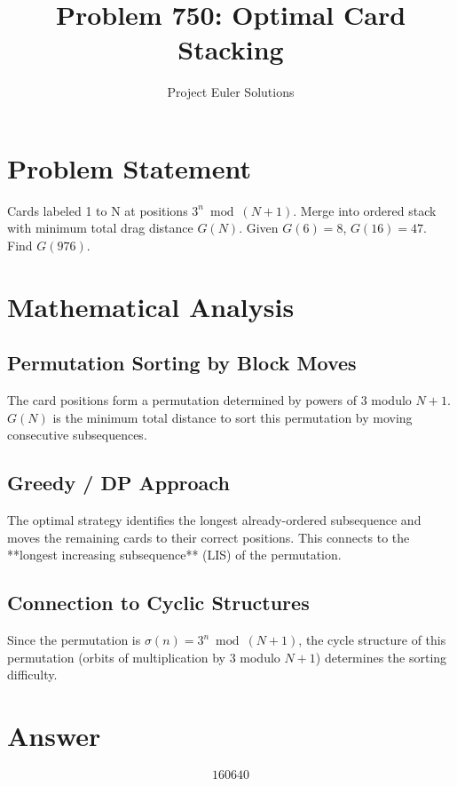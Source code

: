 \documentclass[11pt]{article}
\title{Problem 750: Optimal Card Stacking}
\author{Project Euler Solutions}
\date{}
\begin{document}
\maketitle


\section{Problem Statement}
Cards labeled 1 to N at positions $3^n \bmod (N+1)$. Merge into ordered stack with minimum total drag distance $G(N)$. Given $G(6)=8$, $G(16)=47$. Find $G(976)$.

\section{Mathematical Analysis}
\subsection*{Permutation Sorting by Block Moves}

The card positions form a permutation determined by powers of 3 modulo $N+1$. $G(N)$ is the minimum total distance to sort this permutation by moving consecutive subsequences.

\subsection*{Greedy / DP Approach}

The optimal strategy identifies the longest already-ordered subsequence and moves the remaining cards to their correct positions. This connects to the **longest increasing subsequence** (LIS) of the permutation.

\subsection*{Connection to Cyclic Structures}

Since the permutation is $\sigma(n) = 3^n \bmod (N+1)$, the cycle structure of this permutation (orbits of multiplication by 3 modulo $N+1$) determines the sorting difficulty.

\section{Answer}

\[
\boxed{160640}
\]
\end{document}
